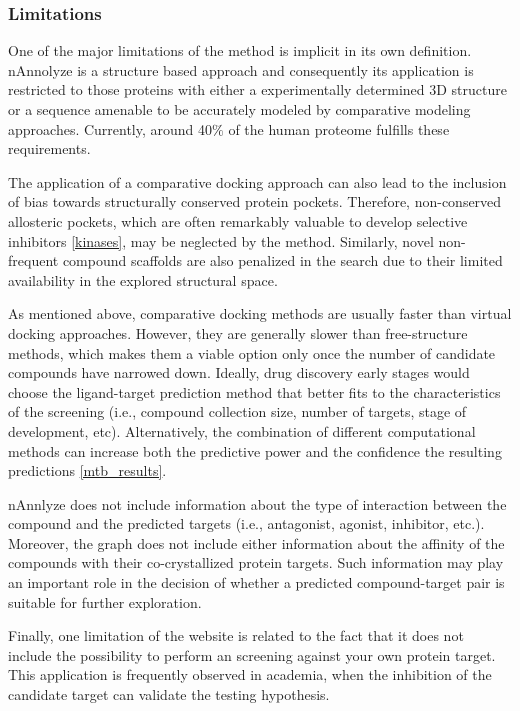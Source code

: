 \documentclass[12pt, b5paper,twoside]{tesi_upf}
\begin{document}
\subsubsection{Limitations}
 \par One of the major limitations of the method is implicit in its own definition. nAnnolyze is a structure based approach and consequently its application is restricted to those proteins with either a experimentally determined 3D structure or a sequence amenable to be accurately modeled by comparative modeling approaches. Currently, around 40$\%$ of the human proteome fulfills these requirements.
 \par The application of a comparative docking approach can also lead to the inclusion of bias towards structurally conserved protein pockets. Therefore, non-conserved allosteric pockets, which are often remarkably valuable to develop selective inhibitors \ref{kinases}, may be neglected by the method. Similarly, novel non-frequent compound scaffolds are also penalized in the search due to their limited availability in the explored structural space. 
 \par As mentioned above, comparative docking methods are usually faster than virtual docking approaches. However, they are generally slower than free-structure methods, which makes them a viable option only once the number of candidate compounds have narrowed down. Ideally, drug discovery early stages would choose the ligand-target prediction method that better fits to the characteristics of the screening (i.e., compound collection size, number of targets, stage of development, etc). Alternatively, the combination of different computational methods can increase both the predictive power and the confidence the resulting predictions \ref{mtb_results}. 
 \par nAnnlyze does not include information about the type of interaction between the compound and the predicted targets (i.e., antagonist, agonist, inhibitor, etc.). Moreover, the graph does not include either information about the affinity of the compounds with their co-crystallized protein targets. Such information may play an important role in the decision of whether a predicted compound-target pair is suitable for further exploration. 
  
 \par Finally, one limitation of the website is related to the fact that it does not include the possibility to perform an screening against your own protein target. This application is frequently observed in academia, when the inhibition of the candidate target can validate the testing hypothesis. 
\end{document}
